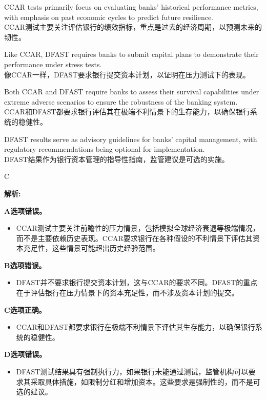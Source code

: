 \documentclass{article}
\newenvironment{explanation}
{\textbf{解析:}\par}
{\par}
\begin{document}
\begin{choices}
    \item CCAR tests primarily focus on evaluating banks' historical performance metrics, with emphasis on past economic cycles to predict future resilience.\\
    CCAR测试主要关注评估银行的绩效指标，重点是过去的经济周期，以预测未来的韧性。
    \item Like CCAR, DFAST requires banks to submit capital plans to demonstrate their performance under stress tests.\\
    像CCAR一样，DFAST要求银行提交资本计划，以证明在压力测试下的表现。
    \item Both CCAR and DFAST require banks to assess their survival capabilities under extreme adverse scenarios to ensure the robustness of the banking system.\\
    CCAR和DFAST都要求银行评估其在极端不利情景下的生存能力，以确保银行系统的稳健性。\\
    \item DFAST results serve as advisory guidelines for banks' capital management, with regulatory recommendations being optional for implementation.\\
    DFAST结果作为银行资本管理的指导性指南，监管建议是可选的实施。
\end{choices}

\begin{correctanswer}
    C
\end{correctanswer}

\begin{explanation}
    \textbf{A选项错误。}
    \begin{itemize}
        \item CCAR测试主要关注前瞻性的压力情景，包括模拟全球经济衰退等极端情况，而不是主要依赖历史表现。CCAR要求银行在各种假设的不利情景下评估其资本充足性，这些情景可能超出历史经验范围。
    \end{itemize}

    \textbf{B选项错误。}
    \begin{itemize}
        \item DFAST并不要求银行提交资本计划，这与CCAR的要求不同。DFAST的重点在于评估银行在压力情景下的资本充足性，而不涉及资本计划的提交。
    \end{itemize}

    \textbf{C选项正确。}
    \begin{itemize}
        \item CCAR和DFAST都要求银行在极端不利情景下评估其生存能力，以确保银行系统的稳健性。
    \end{itemize}

    \textbf{D选项错误。}
    \begin{itemize}
        \item DFAST测试结果具有强制执行力，如果银行未能通过测试，监管机构可以要求其采取具体措施，如限制分红和增加资本。这些要求是强制性的，而不是可选的建议。
    \end{itemize}
\end{explanation}
\end{document}
